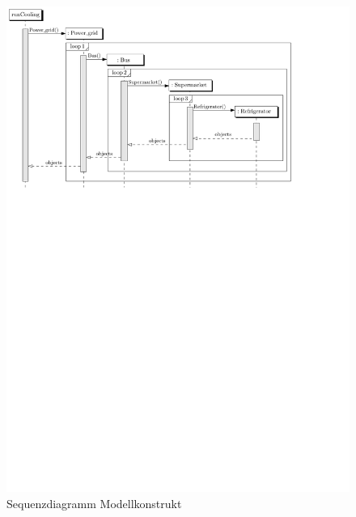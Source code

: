 \begin{figure}[h]
\caption{Sequenzdiagramm Modellkonstrukt}
	\label{fig:uml_sequence}
	\begin{center}
		\includegraphics[scale=0.8]{images/Theorie_Super/sequence_one}
	\end{center}
\end{figure}

